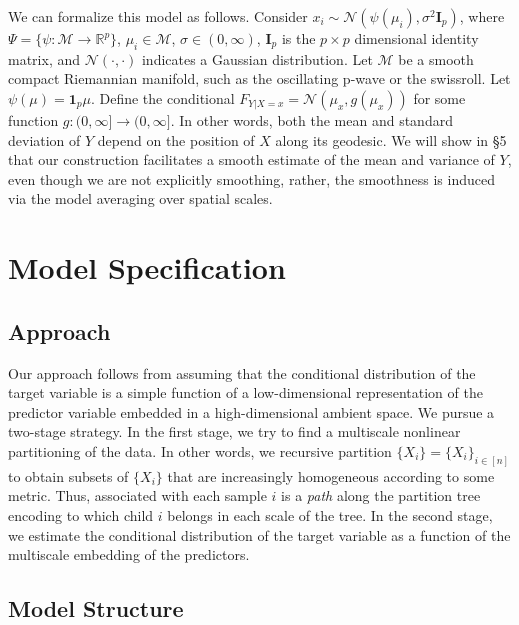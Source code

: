 \documentclass{article}
\newcommand{\Real}{\mathbb{R}}
\providecommand{\mb}[1]{\boldsymbol{#1}}
\providecommand{\mc}[1]{\mathcal{#1}}
\newcommand{\from}{{\ensuremath{\colon}}}           %
\newcommand{\jovo}[1]{{\color{magenta}{\it JoVo says: #1}}}
\begin{document}
We can formalize this model as follows. Consider $x_i \sim \mc{N}(\psi(\mu_i),\sigma^2 \mb{I}_p)$, where $\Psi =\{ \psi \from \mc{M} \to \Real^p\}$, $\mu_i \in \mc{M}$, $\sigma \in (0,\infty)$, $\mb{I}_p$ is the $p\times p$ dimensional identity matrix, and $\mc{N}(\cdot,\cdot)$ indicates a Gaussian distribution.  Let $\mc{M}$ be a smooth compact Riemannian manifold, such as the oscillating p-wave or the swissroll.  Let $\psi(\mu)=\mb{1}_p \mu$. Define the conditional $F_{Y|X=x} = \mc{N}( \mu_x, g(\mu_x))$ for some function $g:(0,\infty]\to(0,\infty]$. In other words, both the mean and standard deviation of $Y$ depend on the position of $X$ along its geodesic. We will show in \S 5 that  our construction facilitates a smooth estimate of the mean and variance of $Y$, even though we are not explicitly smoothing, rather, the smoothness is induced via the  model averaging over spatial scales.

\section{Model Specification} %
\label{sec:approach}
\subsection{Approach}


Our approach follows from assuming that the conditional distribution of the target variable is a simple function of a low-dimensional representation of the predictor variable embedded in a high-dimensional ambient space.  We pursue a two-stage strategy.  In the first stage, we try to find a multiscale nonlinear partitioning of the data.  In other words, we recursive partition $\{X_i\}=\{X_i\}_{i \in [n]}$ to obtain subsets of $\{X_i\}$ that are increasingly homogeneous according to some metric.  Thus, associated with each sample $i$ is a \emph{path} along the partition tree encoding to which child $i$ belongs in each scale of the tree.  In the second stage, we estimate the conditional distribution of the target variable as a function of the multiscale embedding of the predictors.


\subsection{ Model Structure} 

\end{document}

